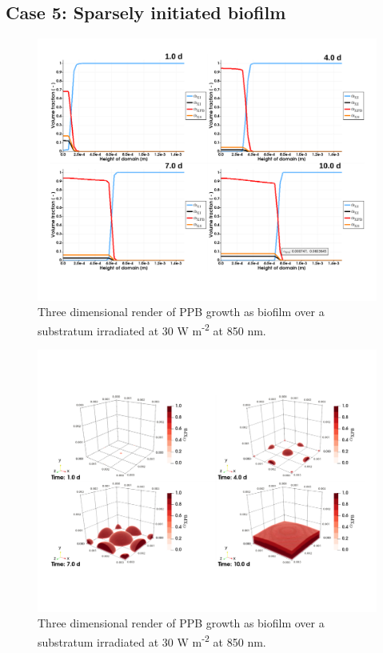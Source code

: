 \subsection{Case 5: Sparsely initiated biofilm}
\begin{figure}[H]
    \centering
    \includegraphics[width=\textwidth,height=0.5\textheight]{Chap4/results/post_processing/renders/case5_3D/case5_3D_dist.pdf}
    \caption{Three dimensional render of PPB growth as biofilm over a substratum irradiated at 30 W m\textsuperscript{-2} at 850 nm. } 
    \label{fig:case5_alpha_distro}
\end{figure}


\begin{figure}[tp]
    \centering
    \includegraphics[width=\textwidth,height=0.5\textheight]{Chap4/results/post_processing/renders/case5_3D/case5_3D_ppb.pdf}
    \caption{Three dimensional render of PPB growth as biofilm over a substratum irradiated at 30 W m\textsuperscript{-2} at 850 nm. } 
    \label{fig:case5_3D_ppb}
\end{figure}


